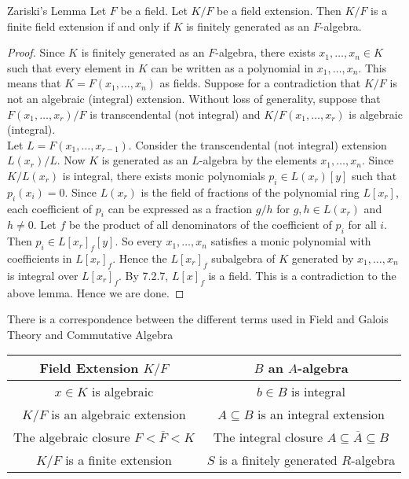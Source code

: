 \documentclass[a4paper]{article}
\begin{document}
\begin{thm}{Zariski's Lemma}{} Let $F$ be a field. Let $K/F$ be a field extension. Then $K/F$ is a finite field extension if and only if $K$ is finitely generated as an $F$-algebra. 
\begin{proof}
Since $K$ is finitely generated as an $F$-algebra, there exists $x_1,\dots,x_n\in K$ such that every element in $K$ can be written as a polynomial in $x_1,\dots,x_n$. This means that $K=F(x_1,\dots,x_n)$ as fields. Suppose for a contradiction that $K/F$ is not an algebraic (integral) extension. Without loss of generality, suppose that $F(x_1,\dots,x_r)/F$ is transcendental (not integral) and $K/F(x_1,\dots,x_r)$ is algebraic (integral). \\

Let $L=F(x_1,\dots,x_{r-1})$. Consider the transcendental (not integral) extension $L(x_r)/L$. Now $K$ is generated as an $L$-algebra by the elements $x_1,\dots,x_n$. Since $K/L(x_r)$ is integral, there exists monic polynomials $p_i\in L(x_r)[y]$ such that $p_i(x_i)=0$. Since $L(x_r)$ is the field of fractions of the polynomial ring $L[x_r]$, each coefficient of $p_i$ can be expressed as a fraction $g/h$ for $g,h\in L(x_r)$ and $h\neq 0$. Let $f$ be the product of all denominators of the coefficient of $p_i$ for all $i$. Then $p_i\in L[x_r]_f[y]$. So every $x_1,\dots,x_n$ satisfies a monic polynomial with coefficients in $L[x_r]_f$. Hence the $L[x_r]_f$ subalgebra of $K$ generated by $x_1,\dots,x_n$ is integral over $L[x_r]_f$. By 7.2.7, $L[x]_f$ is a field. This is a contradiction to the above lemma. Hence we are done. 
\end{proof}
\end{thm}

There is a correspondence between the different terms used in Field and Galois Theory and Commutative Algebra

\begin{table}[!h]
\centering
\begin{tabular}{c|c}
Field Extension $K/F$  & $B$ an $A$-algebra \\ \hline
$x\in K$ is algebraic     & $b\in B$ is integral            \\
$K/F$ is an algebraic extension    & $A\subseteq B$ is an integral extension       \\
The algebraic closure $F<\overline{F}<K$     & The integral closure $A\subseteq\overline{A}\subseteq B$          \\
$K/F$ is a finite extension & $S$ is a finitely generated $R$-algebra
\end{tabular}
\end{table}
\end{document}
